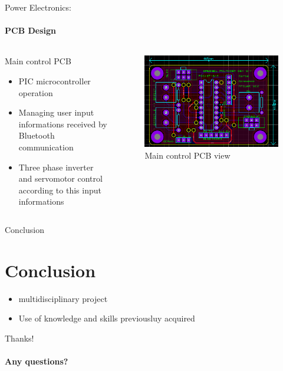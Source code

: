 \documentclass{beamer}
\begin{document}
	\begin{frame}{Power Electronics:}
		\framesubtitle{PCB Design}
		\begin{columns}[T]
	  		\begin{column}{0.5\textwidth}
	  			Main control PCB
		    	\begin{itemize}
		    		\item PIC microcontroller operation
		    		\item Managing user input informations received by Bluetooth communication
		    		\item Three phase inverter and servomotor control according to this input informations
		    	\end{itemize}
	  		\end{column}
	  		\begin{column}{0.5\textwidth}
	  			\begin{figure}
	  				\begin{center}
	  					\includegraphics[height=0.4\textheight]{../Illus/PCB_Main.PNG}
	  				\end{center}
	    			\caption{Main control PCB view}
	    		\end{figure}
	  		\end{column}
		\end{columns}
	\end{frame}	
	\begin{frame}{Conclusion}
	\section*{Conclusion}
	\begin{itemize}
		    \item multidisciplinary project
		    \item Use of knowledge and skills previousluy acquired
		\end{itemize}
	\end{frame}
	\author[]{Florian POUTHIER - Tristan DRUSSEL\\ \tiny florian.pouthier@insa-strasbourg.fr - tristan.drussel@insa-strasbourg.fr}

	\begin{frame}[plain]{Thanks!}
	\framesubtitle{Any questions?}
	\section*{}
		\titlepage
	\end{frame}
\end{document}
